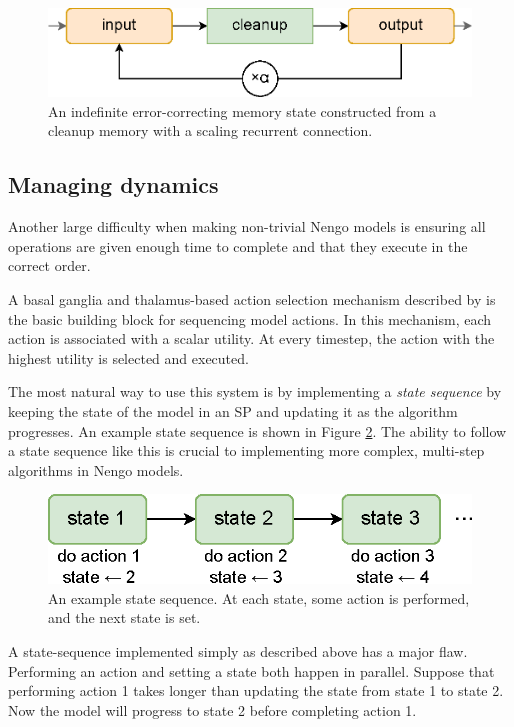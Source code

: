 \documentclass[10pt, a4paper, twocolumn]{article}
\begin{document}
\begin{figure}[h]
	\centering
	\includegraphics[width=0.9\linewidth]{figures/cleanup-state.eps}
	\caption{An indefinite error-correcting memory state constructed from a cleanup memory with a scaling recurrent connection.}
	\label{fig:cleanup-state}
\end{figure}

\subsection{Managing dynamics}

Another large difficulty when making non-trivial Nengo models is ensuring all operations are given enough time to complete and that they execute in the correct order.

A basal ganglia and thalamus-based action selection mechanism described by \cite{Stewart2010} is the basic building block for sequencing model actions. In this mechanism, each action is associated with a scalar utility. At every timestep, the action with the highest utility is selected and executed.

The most natural way to use this system is by implementing a \emph{state sequence} by keeping the state of the model in an SP and updating it as the algorithm progresses. An example state sequence is shown in Figure \ref{fig:state-sequence}. The ability to follow a state sequence like this is crucial to implementing more complex, multi-step algorithms in Nengo models.

\begin{figure}[h]
	\centering
	\includegraphics[width=0.7\linewidth]{figures/state-sequence.eps}
	\caption{An example state sequence. At each state, some action is performed, and the next state is set.}
	\label{fig:state-sequence}
\end{figure}

A state-sequence implemented simply as described above has a major flaw. Performing an action and setting a state both happen in parallel. Suppose that performing action 1 takes longer than updating the state from state 1 to state 2. Now the model will progress to state 2 before completing action 1.
\end{document}
